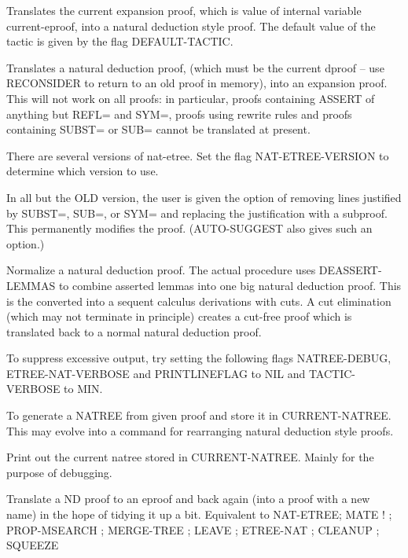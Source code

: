 \begin{description} 
\item[\parbox{\textwidth}{ETREE-NAT \textit{prefix} \textit{num} \textit{tac} \textit{mode}}]  
Translates the current expansion proof, which is value of internal
variable current-eproof, into a natural deduction style proof. The default
value of the tactic is given by the flag DEFAULT-TACTIC.

\item[\parbox{\textwidth}{NAT-ETREE \textit{prefix}}]  
Translates a natural deduction proof, (which must be the current dproof
-- use RECONSIDER to return to an old proof in memory), into an 
expansion proof. This will not work on all proofs: in particular,
proofs containing ASSERT of anything but REFL= and SYM=, proofs 
using rewrite rules and proofs containing SUBST= or SUB= cannot be
translated at present.  

There are several versions of nat-etree.  Set the flag
NAT-ETREE-VERSION to determine which version to use.

In all but the OLD version, the user is given the option of
removing lines justified by SUBST=, SUB=, or SYM= and replacing the justification
with a subproof.  This permanently modifies the proof.  (AUTO-SUGGEST
also gives such an option.)

\item[\parbox{\textwidth}{NORMALIZE-PROOF \textit{prefix}}]  
Normalize a natural deduction proof.  The actual procedure
uses DEASSERT-LEMMAS to combine asserted lemmas into one big natural
deduction proof.  This is the converted into a sequent calculus
derivations with cuts.  A cut elimination (which may not terminate
in principle) creates a cut-free proof which is translated back
to a normal natural deduction proof.

To suppress excessive output, try setting the following flags
NATREE-DEBUG, ETREE-NAT-VERBOSE and PRINTLINEFLAG
to NIL and TACTIC-VERBOSE to MIN.

\item[\parbox{\textwidth}{PFNAT \textit{proof}}]  
To generate a NATREE from given proof and store it in CURRENT-NATREE. This may
evolve into a command for rearranging natural deduction style proofs.

\item[\parbox{\textwidth}{PNTR}]  
Print out the current natree stored in CURRENT-NATREE. Mainly for
the purpose of debugging.

\item[\parbox{\textwidth}{TIDY-PROOF \textit{old-prfname} \textit{new-prfname}}]  
Translate a ND proof to an eproof and back again 
(into a proof with a new name) in the hope of tidying it up a 
bit. Equivalent to
NAT-ETREE; MATE ! ; PROP-MSEARCH ; MERGE-TREE ; LEAVE ; 
ETREE-NAT ; CLEANUP ; SQUEEZE
\item
\end{description}


